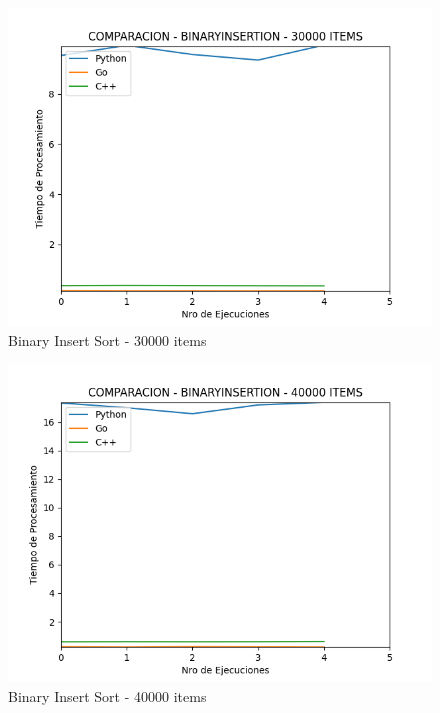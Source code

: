 \documentclass[12pt]{article} %
\begin{document}
    \vspace{5mm}
    
    \begin{figure}[H]
    \centering
    \includegraphics[width=\textwidth]{binaryInsertion_30000}
    \caption{Binary Insert Sort - 30000 items}
    \end{figure}

    \vspace{5mm}
    
    \begin{figure}[H]
    \centering
    \includegraphics[width=\textwidth]{binaryInsertion_40000}
    \caption{Binary Insert Sort - 40000 items}
    \end{figure}
\end{document}
